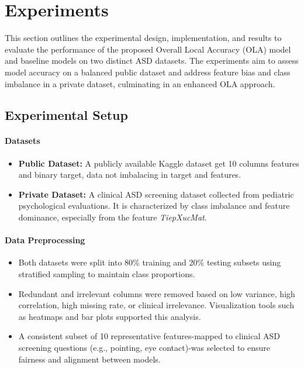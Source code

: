 \documentclass[conference]{IEEEtran}
\begin{document}


\section{Experiments}
This section outlines the experimental design, implementation, and results to evaluate the performance of the proposed Overall Local Accuracy (OLA) model and baseline models on two distinct ASD datasets. The experiments aim to assess model accuracy on a balanced public dataset and address feature bias and class imbalance in a private dataset, culminating in an enhanced OLA approach.

\subsection{Experimental Setup}
\paragraph{\textbf{Datasets}}
\begin{itemize}
\item \textbf{Public Dataset:} A publicly available Kaggle dataset get 10 columns features and binary target, data not imbalacing in target and features. 
\item \textbf{Private Dataset:} A clinical ASD screening dataset collected from pediatric psychological evaluations. It is characterized by class imbalance and feature dominance, especially from the feature \textit{TiepXucMat}.
\end{itemize}

\paragraph{\textbf{Data Preprocessing}}
\begin{itemize}
\item Both datasets were split into 80\% training and 20\% testing subsets using stratified sampling to maintain class proportions.
\item Redundant and irrelevant columns were removed based on low variance, high correlation, high missing rate, or clinical irrelevance. Visualization tools such as heatmaps and bar plots supported this analysis.
\item A consistent subset of 10 representative features-mapped to clinical ASD screening questions (e.g., pointing, eye contact)-was selected to ensure fairness and alignment between models.
\end{itemize}
\end{document}
